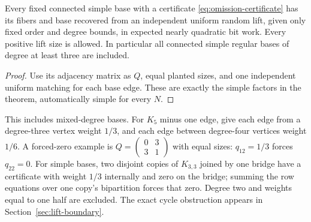 \begin{corollary}\label{cor:random-lift}
Every fixed connected simple base with a certificate
\eqref{eq:omission-certificate} has its fibers and base recovered
from an independent uniform random lift, given only fixed order and
degree bounds, in expected nearly quadratic bit work.
Every positive lift size is allowed. In particular all connected
simple regular bases of degree at least three are included.
\end{corollary}
\begin{proof}
Use its adjacency matrix as $Q$, equal planted sizes, and one
independent uniform matching for each base edge. These are exactly
the simple factors in the theorem, automatically simple for every $N$.
\end{proof}

This includes mixed-degree bases. For $K_5$ minus one edge, give each
edge from a degree-three vertex weight $1/3$, and each edge between
degree-four vertices weight $1/6$. A forced-zero example is
$Q=\left(\begin{smallmatrix}0&3\\3&1\end{smallmatrix}\right)$ with
equal sizes: $q_{12}=1/3$ forces $q_{22}=0$.
For simple bases, two disjoint copies of $K_{3,3}$ joined by one
bridge have a certificate with weight $1/3$ internally and zero on
the bridge; summing the row equations over one copy's bipartition
forces that zero. Degree two and weights equal to one half are
excluded. The exact cycle obstruction appears in
Section~\ref{sec:lift-boundary}.

